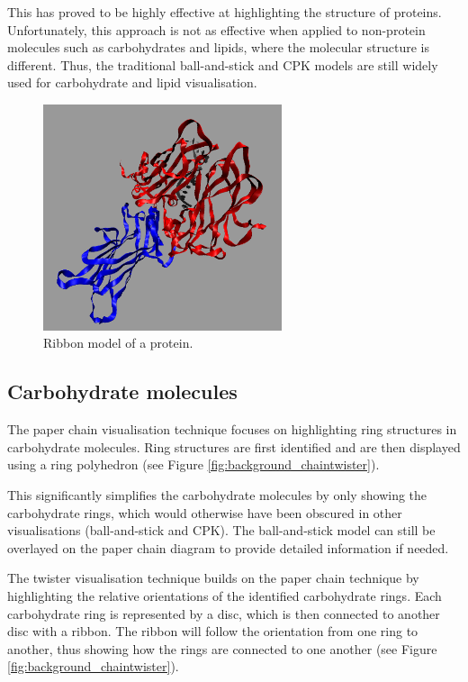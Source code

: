 This has proved to be highly effective at highlighting the structure of
proteins.  Unfortunately, this approach is not as effective when applied to
non-protein molecules such as carbohydrates and lipids, where the molecular
structure is different. Thus, the traditional ball-and-stick and CPK models are
still widely used for carbohydrate and lipid visualisation.

\begin{figure}[h!]
  \begin{center}
    \includegraphics[width=70mm]{ribbon}
  \end{center}
  \caption{Ribbon model of a protein.}
  \label{fig:background_ribbon}
\end{figure}


\subsection{Carbohydrate molecules}
\label{sub:background_carbohydrate}

The paper chain visualisation technique \citep{kuttel06} focuses on
highlighting ring structures in carbohydrate molecules. Ring structures are
first identified and are then displayed using a ring polyhedron (see Figure
\ref{fig:background_chaintwister}).

This significantly simplifies the carbohydrate molecules by only showing the
carbohydrate rings, which would otherwise have been obscured in other
visualisations (ball-and-stick and CPK). The ball-and-stick model can still be
overlayed on the paper chain diagram to provide detailed information if needed.

The twister visualisation technique \citep{kuttel06} builds on the paper chain
technique by highlighting the relative orientations of the identified
carbohydrate rings. Each carbohydrate ring is represented by a disc, which is
then connected to another disc with a ribbon. The ribbon will follow the
orientation from one ring to another, thus showing how the rings are connected
to one another (see Figure \ref{fig:background_chaintwister}).

